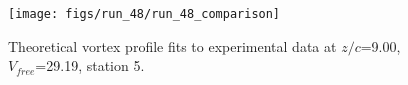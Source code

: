 \begin{figure}[H]
\centering
\texttt{[image: figs/run\_48/run\_48\_comparison]}
\caption{Theoretical vortex profile fits to experimental data at $z/c$=9.00, $V_{free}$=29.19, station 5.}
\end{figure}


